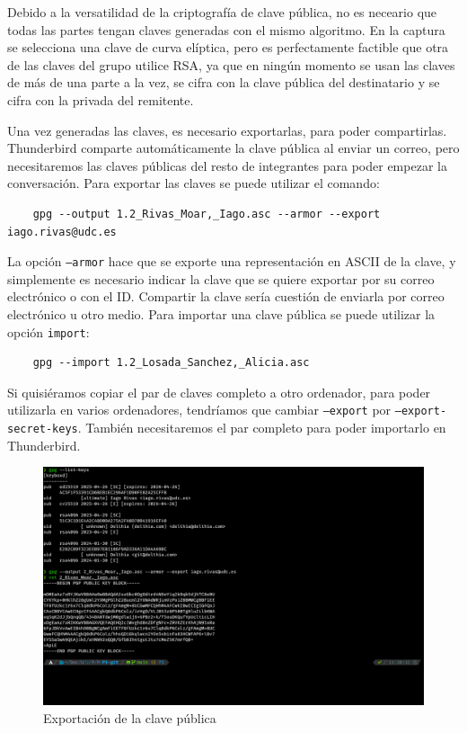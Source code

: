 Debido a la versatilidad de la criptografía de clave pública, no es neceario que todas las partes tengan claves generadas con el mismo algoritmo. En la captura se selecciona una clave de curva elíptica, pero es perfectamente factible que otra de las claves del grupo utilice RSA, ya que en ningún momento se usan las claves de más de una parte a la vez, se cifra con la clave pública del destinatario y se cifra con la privada del remitente.

Una vez generadas las claves, es necesario exportarlas, para poder compartirlas. Thunderbird comparte automáticamente la clave pública al enviar un correo, pero necesitaremos las claves públicas del resto de integrantes para poder empezar la conversación. Para exportar las claves se puede utilizar el comando:

\begin{verbatim}
    gpg --output 1.2_Rivas_Moar,_Iago.asc --armor --export iago.rivas@udc.es
\end{verbatim}

La opción \texttt{--armor} hace que se exporte una representación en ASCII de la clave, y simplemente es necesario indicar la clave que se quiere exportar por su correo electrónico o con el ID. Compartir la clave sería cuestión de enviarla por correo electrónico u otro medio. Para importar una clave pública se puede utilizar la opción \texttt{import}:

\begin{verbatim}
    gpg --import 1.2_Losada_Sanchez,_Alicia.asc
\end{verbatim}

Si quisiéramos copiar el par de claves completo a otro ordenador, para poder utilizarla en varios ordenadores, tendríamos que cambiar \texttt{--export} por \texttt{--export-secret-keys}. También necesitaremos el par completo para poder importarlo en Thunderbird.

\begin{figure}[H]
    \centering
    \includegraphics[width=\textwidth]{gpg-export.png}
    \caption{Exportación de la clave pública}
\end{figure}

